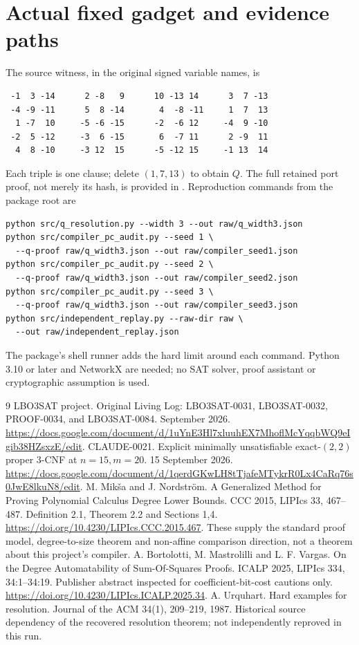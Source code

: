 \documentclass[11pt]{article}
\begin{document}
\section{Actual fixed gadget and evidence paths}
The source witness, in the original signed variable names, is
\begin{verbatim}
 -1  3 -14      2 -8   9      10 -13 14      3  7 -13
 -4 -9 -11      5  8 -14       4  -8 -11     1  7  13
  1 -7  10     -5 -6 -15      -2  -6 12     -4  9 -10
 -2  5 -12     -3  6 -15       6  -7 11      2 -9  11
  4  8 -10     -3 12  15      -5 -12 15     -1 13  14
\end{verbatim}
Each triple is one clause; delete $(1,7,13)$ to obtain $Q$. The full retained port proof, not merely its hash, is provided in . Reproduction commands from the package root are
\begin{verbatim}
python src/q_resolution.py --width 3 --out raw/q_width3.json
python src/compiler_pc_audit.py --seed 1 \
  --q-proof raw/q_width3.json --out raw/compiler_seed1.json
python src/compiler_pc_audit.py --seed 2 \
  --q-proof raw/q_width3.json --out raw/compiler_seed2.json
python src/compiler_pc_audit.py --seed 3 \
  --q-proof raw/q_width3.json --out raw/compiler_seed3.json
python src/independent_replay.py --raw-dir raw \
  --out raw/independent_replay.json
\end{verbatim}
The package's shell runner adds the hard limit around each command. Python 3.10 or later and NetworkX are needed; no SAT solver, proof assistant or cryptographic assumption is used.

\begin{thebibliography}{9}
 LBO3SAT project. Original Living Log: LBO3SAT-0031, LBO3SAT-0032, PROOF-0034, and LBO3SAT-0084. September 2026. \url{https://docs.google.com/document/d/1uYnE3Hl7xluuhEX7MhoflMcYqqbWQ9eIgib38HZsxzE/edit}.
\bibitem{witness} CLAUDE-0021. Explicit minimally unsatisfiable exact-$(2,2)$ proper 3-CNF at $n=15,m=20$. 15 September 2026. \url{https://docs.google.com/document/d/1qerdGKwLH8tTjafeMTykrR0Lx4CaRq76s0JwE8lkuN8/edit}.
 M. Mik\v{s}a and J. Nordstr\"om. A Generalized Method for Proving Polynomial Calculus Degree Lower Bounds. CCC 2015, LIPIcs 33, 467--487. Definition 2.1, Theorem 2.2 and Sections 1,4. \url{https://doi.org/10.4230/LIPIcs.CCC.2015.467}. These supply the standard proof model, degree-to-size theorem and non-affine comparison direction, not a theorem about this project's compiler.
\bibitem{bmv} A. Bortolotti, M. Mastrolilli and L. F. Vargas. On the Degree Automatability of Sum-Of-Squares Proofs. ICALP 2025, LIPIcs 334, 34:1--34:19. Publisher abstract inspected for coefficient-bit-cost cautions only. \url{https://doi.org/10.4230/LIPIcs.ICALP.2025.34}.
\bibitem{urquhart} A. Urquhart. Hard examples for resolution. Journal of the ACM 34(1), 209--219, 1987. Historical source dependency of the recovered resolution theorem; not independently reproved in this run.
\end{thebibliography}
\end{document}
